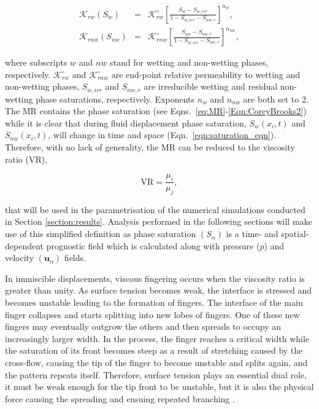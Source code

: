 \documentclass[preprint,authoryear,12pt]{elsarticle}
\newcommand{\frc}{\displaystyle\frac}
\begin{document}
\begin{eqnarray}
  \mathcal{K}_{rw}\left(S_{w}\right) &=& \mathcal{K}^{\circ}_{rw}\left[\frc{S_{w}-S_{w,irr}}{1-S_{w,irr}-S_{nw,r}}\right]^{n_{w}}, \label{Eqn:CoreyBrooks1}\\
  \mathcal{K}_{rnw}\left(S_{nw}\right) &=& \mathcal{K}^{\circ}_{rnw}\left[\frc{S_{nw}-S_{nw,r}}{1-S_{w,irr}-S_{nw,r}}\right]^{n_{nw}}, \label{Eqn:CoreyBrooks2}
\end{eqnarray}

\noindent where subscripts $w$ and $nw$ stand for wetting and non-wetting phases, respectively. $\mathcal{K}^{\circ}_{rw}$ and $\mathcal{K}^{\circ}_{rnw}$ are end-point relative permeability to wetting and non-wetting phases, $S_{w,irr}$ and $S_{nw,r}$ are irreducible wetting and residual non-wetting phase saturations, respectively. Exponents $n_{w}$ and $n_{nw}$ are both set to 2. The MR contains the phase saturation (see Eqns.~\ref{eq:MR}-\ref{Eqn:CoreyBrooks2}) while it is clear that during fluid displacement phase saturation, $S_{w}\left(x_{i},t\right)$ and $S_{nw}\left(x_{i},t\right)$, will change in time and space (Eqn.~\ref{eqn:saturation_eqn}). Therefore, with no lack of generality, the MR can be reduced to the viscosity ratio (VR),

\begin{displaymath}
    \text{VR} = \frc{\mu_{i}}{\mu_{j}},
\end{displaymath}

\noindent that will be used in the parametrisation of the numerical simulations conducted in Section \ref{section:results}. Analysis performed in the following sections will make use of this simplified definition as phase saturation $\left(S_{\alpha}\right)$ is a time- and spatial-dependent prognostic field which is calculated along with pressure ($p$) and velocity $\left(\mathbf{u}_{\alpha}\right)$ fields.

\medskip
In immiscible displacements, viscous fingering occurs when the viscosity ratio is greater than unity. As surface tension becomes weak, the interface is stressed and becomes unstable leading to the formation of fingers. %
The interface of the main finger collapses and starts splitting into new lobes of fingers. One of these new fingers may eventually outgrow the others and then spreads to occupy an increasingly larger width. In the process, the finger reaches a critical width while the saturation %
of its front becomes steep as a result of stretching caused by the cross-flow, causing the tip of the finger to become unstable and splits again, and the pattern repeats itself. Therefore, surface tension plays an essential dual role, it must be weak enough for the tip front to be unstable, but it is also the physical force causing the spreading and ensuing repeated branching \citep{tan_1988, carvalho_2013}.
\end{document}

